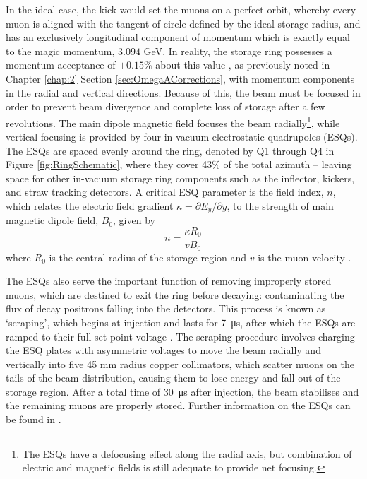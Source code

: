 In the ideal case, the kick would set the muons on a perfect orbit, whereby every muon is aligned with the tangent of circle defined by the ideal storage radius, and has an exclusively longitudinal component of momentum which is exactly equal to the magic momentum, $3.094$ GeV. In reality, the storage ring possesses a momentum acceptance of $\pm0.15$\% about this value \cite{BeamDynamics}, as previously noted in Chapter \ref{chap:2} Section \ref{sec:OmegaACorrections}, with momentum components in the radial and vertical directions. Because of this, the beam must be focused in order to prevent beam divergence and complete loss of storage after a few revolutions. The main dipole magnetic field focuses the beam radially\footnote{The ESQs have a defocusing effect along the radial axis, but combination of electric and magnetic fields is still adequate to provide net focusing.}, while vertical focusing is provided by four in-vacuum electrostatic quadrupoles (ESQs). The ESQs are spaced evenly around the ring, denoted by Q1 through Q4 in Figure \ref{fig:RingSchematic}, where they cover 43\% of the total azimuth --  leaving space for other in-vacuum storage ring components such as the inflector, kickers, and straw tracking detectors. A critical ESQ parameter is the field index, $n$, which relates the electric field gradient $\kappa = \partial E_{y} / \partial y$, to the strength of main magnetic dipole field, $B_{0}$, given by
%
\begin{equation}
  n = \frac{\kappa R_{0}}{v B_{0}} 
  \label{eqn:FieldIndex}
\end{equation}
where $R_{0}$ is the central radius of the storage region and $v$ is the muon velocity \cite{TDR}. %

The ESQs also serve the important function of removing improperly stored muons, which are destined to exit the ring before decaying: contaminating the flux of decay positrons falling into the detectors. This process is known as `scraping', which begins at injection and lasts for \SI{7}{\micro\second}, after which the ESQs are ramped to their full set-point voltage \cite{BeamDynamics}. The scraping procedure involves charging the ESQ plates with asymmetric voltages to move the beam radially and vertically into five 45 mm radius copper collimators, which scatter muons on the tails of the beam distribution, causing them to lose energy and fall out of the storage region. After a total time of \SI{30}{\micro\second} after injection, the beam stabilises and the remaining muons are properly stored. Further information on the ESQs can be found in \cite{TDR}.

